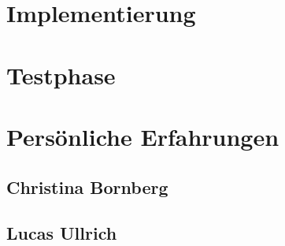 \section{Implementierung}


\section{Testphase}


\section{Persönliche Erfahrungen}

  \subsection{Christina Bornberg}

  \subsection{Lucas Ullrich}
